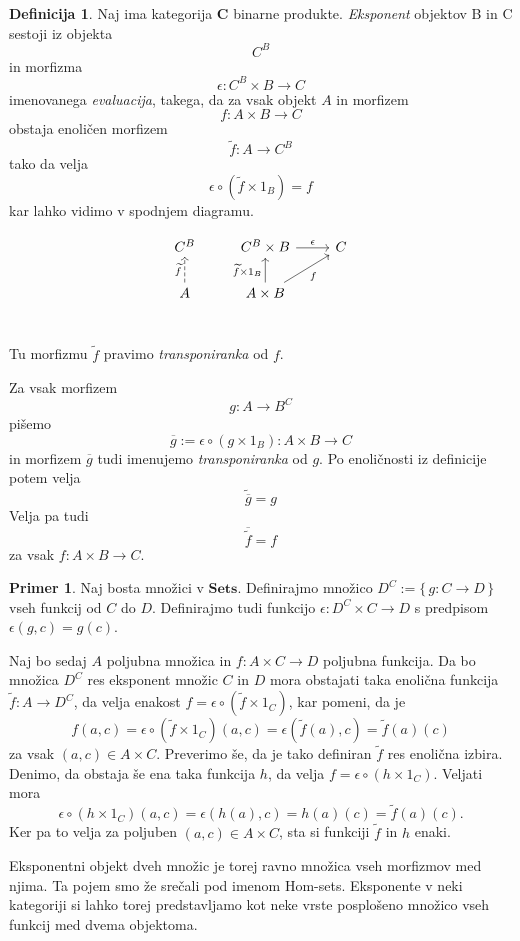 \documentclass[12pt,a4paper]{book}
\theoremstyle{definition}
\newtheorem{definicija}{Definicija}[chapter]
\theoremstyle{plain}
\theoremstyle{definition}
\newtheorem{primer}{Primer}[section]
\theoremstyle{remark}
\newcommand{\cat}[1]{\textbf{#1}}
\renewcommand{\set}[1]{\{\,#1\,\}}
\begin{document}
\begin{definicija}
Naj ima kategorija $\cat{C}$ binarne produkte. \textit{Eksponent} objektov B in C sestoji iz objekta 
$$C^B$$
in morfizma
$$\epsilon : C^B \times B \to C$$ imenovanega \textit{evaluacija}, takega, da za vsak objekt $A$ in morfizem 
$$f : A \times B \to C$$
obstaja enoličen morfizem 
$$\widetilde{f} : A \to C^B$$
tako da velja
$$\epsilon \circ (\widetilde{f} \times 1_B) = f$$
kar lahko vidimo v spodnjem diagramu.

$$\begin{tikzcd}
C^B &  C^B \times B \ar[r, "\epsilon"] & C \\
A \ar[u, dashed, "\widetilde{f}"] &  A \times B \ar[u, "\widetilde{f} \times 1_B"] \ar[ur, "f"'] & \\
\end{tikzcd}$$

Tu morfizmu $\widetilde{f}$ pravimo \textit{transponiranka} od $f$.

\end{definicija}

Za vsak morfizem $$g : A \to B^C$$ pišemo
$$ \overline{g} := \epsilon \circ (g \times 1_B) : A \times B \to C$$
in morfizem $\overline{g}$ tudi imenujemo \textit{transponiranka} od $g$. Po enoličnosti iz definicije potem velja
$$\widetilde{\overline{g}} = g$$
Velja pa tudi
$$\overline{\widetilde{f}} = f$$
za vsak $f : A \times B \to C$.

\begin{primer}
Naj bosta množici v $\cat{Sets}$. Definirajmo množico $D^C := \set{g : C \to D}$ vseh funkcij od $C$ do $D$. Definirajmo tudi funkcijo $\epsilon : D^C \times C \to D$ s predpisom $\epsilon(g,c) = g(c)$.

Naj bo sedaj $A$ poljubna množica in $f : A \times C \to D$ poljubna funkcija. Da bo množica $D^C$ res eksponent množic $C$ in $D$ mora obstajati taka enolična funkcija $\widetilde{f} : A \to D^C$, da velja enakost $f = \epsilon \circ (\widetilde{f} \times 1_C)$, kar pomeni, da je
$$f(a,c) = \epsilon \circ (\widetilde{f} \times 1_C)(a,c) = \epsilon(\widetilde{f}(a),c) = \widetilde{f}(a)(c)$$
za vsak $(a,c) \in A \times C$. Preverimo še, da je tako definiran $\widetilde{f}$ res enolična izbira. Denimo, da obstaja še ena taka funkcija $h$, da velja $f = \epsilon \circ (h \times 1_C)$. Veljati mora
$$\epsilon \circ (h \times 1_C)(a,c) = \epsilon(h(a),c) = h(a)(c) = \widetilde{f}(a)(c).$$
Ker pa to velja za poljuben $(a,c) \in A \times C$, sta si funkciji $\widetilde{f}$ in $h$ enaki.

Eksponentni objekt dveh množic je torej ravno množica vseh morfizmov med njima. Ta pojem smo že srečali pod imenom Hom-sets.
Eksponente v neki kategoriji si lahko torej predstavljamo kot neke vrste posplošeno množico vseh funkcij med dvema objektoma. 
\end{primer}
\end{document}
